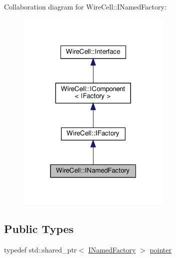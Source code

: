 Collaboration diagram for Wire\+Cell\+:\+:I\+Named\+Factory\+:
\nopagebreak
\begin{figure}[H]
\begin{center}
\leavevmode
\includegraphics[width=208pt]{class_wire_cell_1_1_i_named_factory__coll__graph}
\end{center}
\end{figure}
\subsection*{Public Types}
\begin{DoxyCompactItemize}
\item 
typedef std\+::shared\+\_\+ptr$<$ \hyperlink{class_wire_cell_1_1_i_named_factory}{I\+Named\+Factory} $>$ \hyperlink{class_wire_cell_1_1_i_named_factory_a76fa5c86b2a5f65a74952f8bec4941d2}{pointer}
\end{DoxyCompactItemize}
